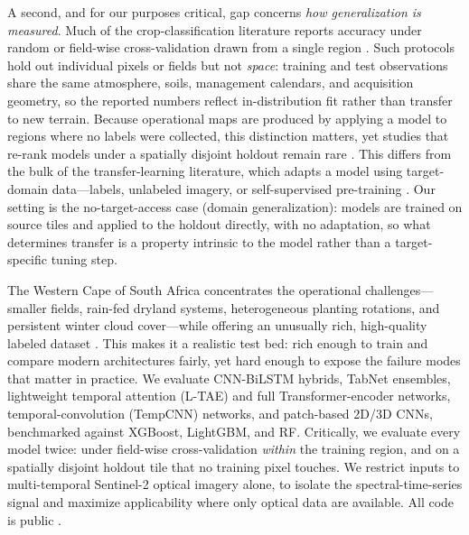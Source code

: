 \documentclass[preprint,authoryear]{elsarticle}
\begin{document}
A second, and for our purposes critical, gap concerns \emph{how generalization is measured}. Much of the crop-classification literature reports accuracy under random or field-wise cross-validation drawn from a single region \citep{belgiu2016, ltae2020, tempcnn2019, russwurm2018, ieee2017}. Such protocols hold out individual pixels or fields but not \emph{space}: training and test observations share the same atmosphere, soils, management calendars, and acquisition geometry, so the reported numbers reflect in-distribution fit rather than transfer to new terrain. Because operational maps are produced by applying a model to regions where no labels were collected, this distinction matters, yet studies that re-rank models under a spatially disjoint holdout remain rare \citep{pankajakshan2025, jin2019, rustowicz2019}. This differs from the bulk of the transfer-learning literature, which adapts a model using target-domain data---labels, unlabeled imagery, or self-supervised pre-training \citep{ma2024, cropformer2023, mai2025}. Our setting is the no-target-access case (domain generalization): models are trained on source tiles and applied to the holdout directly, with no adaptation, so what determines transfer is a property intrinsic to the model rather than a target-specific tuning step.

The Western Cape of South Africa concentrates the operational challenges---smaller fields, rain-fed dryland systems, heterogeneous planting rotations, and persistent winter cloud cover---while offering an unusually rich, high-quality labeled dataset \citep{mlhub}. This makes it a realistic test bed: rich enough to train and compare modern architectures fairly, yet hard enough to expose the failure modes that matter in practice. We evaluate CNN-BiLSTM hybrids, TabNet ensembles, lightweight temporal attention (L-TAE) and full Transformer-encoder networks, temporal-convolution (TempCNN) networks, and patch-based 2D/3D CNNs, benchmarked against XGBoost, LightGBM, and RF. Critically, we evaluate every model twice: under field-wise cross-validation \emph{within} the training region, and on a spatially disjoint holdout tile that no training pixel touches. We restrict inputs to multi-temporal Sentinel-2 optical imagery alone, to isolate the spectral-time-series signal and maximize applicability where only optical data are available. All code is public \citep{primary_repo}.
\end{document}

